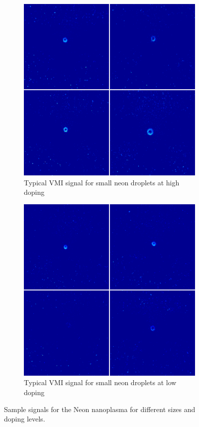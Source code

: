 \begin{figure}[h!]
\hfill
\begin{subfigure}[l]{0.4\textwidth}
\caption{Typical VMI signal for small neon droplets at high doping}
\includegraphics[width=1\textwidth]{../Images/results/MIR_Ne_XeDop_39K/RAw_NE_39KHighdop.png} 
\end{subfigure}
\begin{subfigure}[l]{0.4\textwidth}
\caption{Typical VMI signal for small neon droplets at low doping}
\includegraphics[width=1\textwidth]{../Images/results/MIR_Ne_XeDop_39K/RAw_NE_39Klowdop.png} 
\end{subfigure}
\hfill
\caption[MIR Neon raw samples]{Sample signals for the Neon nanoplasma for different sizes and doping levels. }
\label{fig:neonrwasample}
\end{figure}


